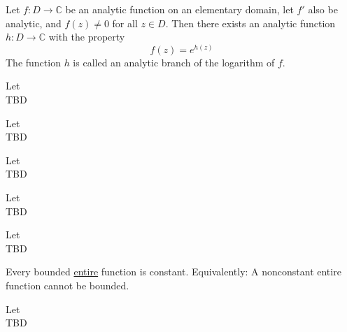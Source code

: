 \begin{theorem}
    \label{sec:BranchLog}

    Let $f : D \rightarrow \mathbb{C}$ be an analytic function on an elementary domain, let $f'$
    also be analytic, and $f(z) \neq 0$ for all $z \in D$. Then there exists an analytic function
    $h : D \rightarrow \mathbb{C}$ with the property
    $$f(z) = e^{h(z)}$$
    The function $h$ is called an analytic branch of the logarithm of $f$.

\end{theorem}


\begin{theorem}[Lemma (II.3.1)]
    \label{sec:LemmaII31}
    Let \\
    TBD
\end{theorem}


\begin{theorem}
    \label{sec:CauchyIF}
    Let \\
    TBD
\end{theorem}


\begin{theorem}
    \label{sec:LeibnizRule}
    Let \\
    TBD
\end{theorem}


\begin{theorem}
    \label{sec:GCauchyIF}
    Let \\
    TBD
\end{theorem}


\begin{theorem}
    \label{sec:MoreraT}
    Let \\
    TBD
\end{theorem}


\begin{theorem}
    \label{sec:LiouvilleT}
    Every bounded \hyperref[sec:EntireFunction]{entire} function is constant. Equivalently: A nonconstant entire
    function cannot be bounded.
\end{theorem}


\begin{theorem}
    \label{sec:FTAlgebra}
    Let \\
    TBD
\end{theorem}